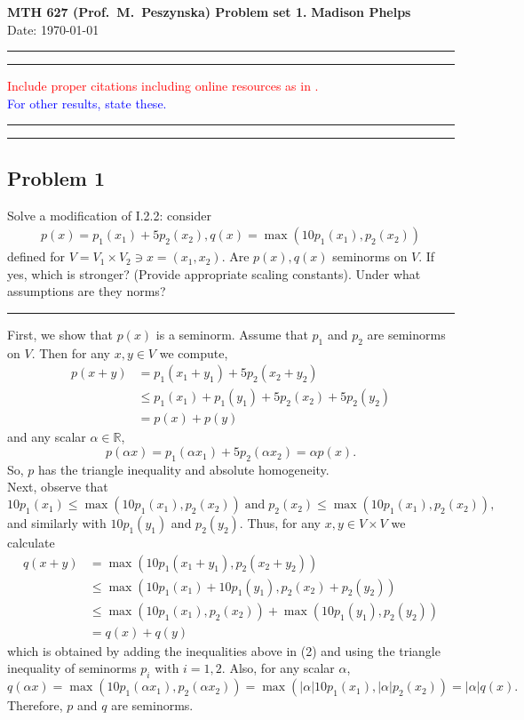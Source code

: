 \documentclass[12pt]{amsart}
\newcommand{\R}{\mathbb{R}}
\begin{document}
\noindent
\textbf{MTH 627 (Prof.~M.~Peszynska) Problem set 1. } \hfill \textbf{Madison Phelps}\\
\hfill Date: \today\\
\medskip
\hrule
\hrule
\medskip
\noindent
\textcolor{red}{Include  proper citations including online resources as in  \cite[Chap.I, Theorem 1.1]{Showalter}. 
} 
\\
\textcolor{blue}{For other results, state these.} 

\medskip
\hrule
\hrule
\medskip
\subsection*{Problem 1}
Solve a modification of I.2.2: consider 
\begin{eqnarray}
p(x)=p_1(x_1)+5p_2(x_2), q(x)=\max(10 p_1(x_1),p_2(x_2))
\end{eqnarray}
defined for $V=V_1 \times V_2 \ni x=(x_1,x_2)$. Are $p(x),q(x)$ seminorms on $V$. If yes, which is stronger? (Provide appropriate scaling constants). Under what assumptions are they norms?  
%
\\
\medskip
\hrule
\medskip
%

First, we show that $p(x)$ is a seminorm. Assume that $p_1$ and $p_2$ are seminorms on $V$. Then for any $x,y\in V$ we compute,		
\begin{align*}
		p(x+y) & = p_1(x_1+y_1)+5p_2(x_2+y_2)\\
			   & \leq p_1(x_1) + p_1(y_1) + 5p_2(x_2) + 5p_2(y_2)\\
			   & = p(x) + p(y)
	\end{align*}
and any scalar $\alpha\in \R$, 
	\[p(\alpha x) = p_1(\alpha x_1) + 5p_2(\alpha x_2) = \alpha p(x).\]   
So, $p$ has the triangle inequality and absolute homogeneity.\\

Next, observe that 
	\begin{equation} 10p_1(x_1) \leq \max( 10 p_1(x_1), p_2(x_2)) \; \text{and}\; p_2(x_2) \leq \max( 10 p_1(x_1), p_2(x_2)), 
	\end{equation}
	and similarly with $10p_1(y_1)$ and $p_2(y_2)$. Thus, for any $x,y\in V\times V$ we calculate 
	\begin{align*}
		q(x+y) & = \max(10 p_1(x_1+y_1),p_2(x_2+y_2))\\
			   & \leq \max(10 p_1(x_1)+10p_1(y_1),p_2(x_2)+p_2(y_2))\\
			   & \leq \max(10 p_1(x_1),p_2(x_2)) + \max(10p_1(y_1),p_2(y_2))\\
			   & = q(x) + q(y)
	\end{align*}
which is obtained by adding the inequalities above in (2) and using the triangle inequality of seminorms $p_i$ with $i = 1,2$. Also, for any scalar $\alpha$, 
	\[q(\alpha x) = \max(10 p_1(\alpha x_1),p_2(\alpha x_2)) = 
		\max(|\alpha| 10 p_1(x_1),|\alpha|p_2(x_2)) = |\alpha| q(x). \]
Therefore, $p$ and $q$ are seminorms.\\
\end{document}
